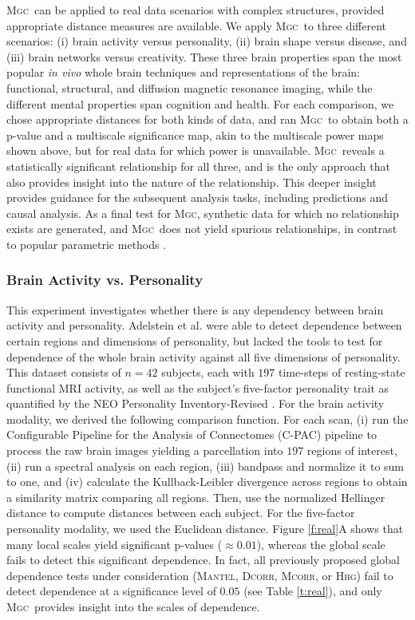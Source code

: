 \documentclass[11pt]{article}
\providecommand{\sct}[1]{{\normalfont\textsc{#1}}}
\newcommand{\Mgc}{\sct{Mgc}}
\newcommand{\Hhg}{\sct{Hhg}}
\newcommand{\Dcorr}{\sct{Dcorr}}
\newcommand{\Mcorr}{\sct{Mcorr}}
\newcommand{\Mantel}{\sct{Mantel}}
\begin{document}
\Mgc~can be applied to real data scenarios with complex structures, provided appropriate distance measures are available. We apply \Mgc~to three different scenarios: (i) brain activity versus personality, (ii) brain shape versus disease, and (iii) brain networks versus creativity.  These three brain properties span the most popular \emph{in vivo} whole brain techniques and representations of the brain: functional, structural, and diffusion magnetic resonance imaging, while the different mental properties span cognition and health.  
For each comparison, we chose appropriate distances for both kinds of data, and ran \Mgc~to obtain both a p-value and a multiscale significance map, akin to the multiscale power maps shown above, but for real data for which power is unavailable. \Mgc~reveals a statistically significant relationship for all three, and is the only approach that also provides insight into the nature of the relationship. 
This deeper insight provides guidance for the subsequent analysis tasks, including predictions and causal analysis. As a final test for \Mgc, synthetic data for which no relationship exists are generated, and \Mgc~does not yield spurious relationships, in contrast to popular parametric methods \cite{EklundKnutsson2012,Eklund2015}. 


\subsubsection*{Brain Activity vs. Personality} 

This experiment investigates whether there is any dependency between brain activity and personality.
Adelstein et al. \cite{AdelsteinEtAl2011} were able to detect dependence between certain regions and dimensions of personality, but lacked the tools to test for dependence of the whole brain activity against all five dimensions of personality. 
This dataset consists of $n=42$ subjects, each with  $197$ time-steps of resting-state functional MRI activity, as well as the subject's five-factor personality trait as quantified by  the NEO Personality Inventory-Revised  \cite{Costa1992}. 
For the brain activity modality, we derived the following comparison function. For each scan, (i) 
run the Configurable Pipeline for the Analysis of Connectomes (C-PAC) pipeline \cite{CPAC2015} to process the raw brain images yielding a parcellation into $197$ regions of interest, 
(ii) run a spectral analysis on each region, (iii) bandpass and normalize it to sum to one, and (iv) calculate the Kullback-Leibler divergence across regions to obtain a similarity matrix comparing all regions.  Then, use the normalized Hellinger distance to compute distances between each subject. 
For the five-factor personality modality, we  used the Euclidean distance.
% 
Figure \ref{f:real}{\color{magenta}A}  shows that many local scales yield significant p-values ($\approx 0.01$), whereas the global scale fails to detect this significant dependence. In fact, all previously proposed global dependence tests under consideration (\Mantel, \Dcorr, \Mcorr, or \Hhg) fail to detect dependence at a significance level of $0.05$ (see Table \ref{t:real}), and only \Mgc~provides insight into the scales of dependence.
\end{document}
